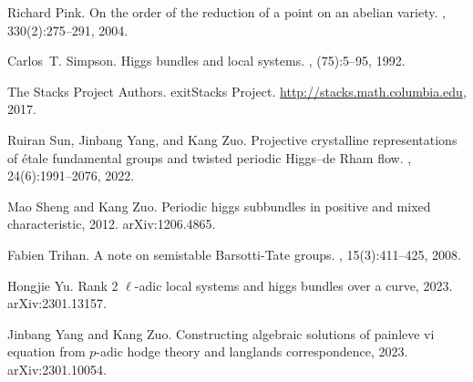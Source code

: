 \documentclass[12pt,twoside]{book}
\theoremstyle{plain}
\theoremstyle{definition}
\theoremstyle{remark}
\numberwithin{equation}{section}
\begin{document}
\begin{thebibliography}{{Ked}07}
Richard Pink.
\newblock On the order of the reduction of a point on an abelian variety.
, 330(2):275--291, 2004.

Carlos~T. Simpson.
\newblock Higgs bundles and local systems.
, (75):5--95, 1992.

The {Stacks Project Authors}.
\newblock exit{Stacks Project}.
\newblock \url{http://stacks.math.columbia.edu}, 2017.

Ruiran Sun, Jinbang Yang, and Kang Zuo.
\newblock Projective crystalline representations of \'{e}tale fundamental
  groups and twisted periodic {H}iggs--de {R}ham flow.
, 24(6):1991--2076, 2022.

Mao Sheng and Kang Zuo.
\newblock Periodic higgs subbundles in positive and mixed characteristic, 2012.
\newblock arXiv:1206.4865.

Fabien Trihan.
\newblock A note on semistable {Barsotti}-{Tate} groups.
, 15(3):411--425, 2008.

Hongjie Yu.
\newblock Rank 2 $\ell$-adic local systems and higgs bundles over a curve,
  2023.
\newblock arXiv:2301.13157.

Jinbang Yang and Kang Zuo.
\newblock Constructing algebraic solutions of painleve vi equation from
  $p$-adic hodge theory and langlands correspondence, 2023.
\newblock arXiv:2301.10054.

\end{thebibliography}
\end{document}
